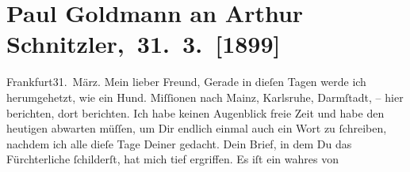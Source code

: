 

         
         \renewcommand{\erwaehntePersonen}{Personen: Leo Feld, Clementine Goldmann, Carl Karlweis, Fedor Mamroth, Marie Reinhard, Josef Rosengart, Vally Rosengart, Ferdinand von Saar}
         \renewcommand{\erwaehnteInstitutionen}{Institutionen: Bauernfeld-Preis}
         \renewcommand{\erwaehnteOrte}{Orte: Darmstadt, Frankfurt am Main, Karlsruhe, Mainz, Wien, Wiesbaden}
         \renewcommand{\erwaehnteWerke}{}
               \section[ Paul Goldmann an Arthur Schnitzler, 31. 3. {[}1899{]}]{ Paul Goldmann an Arthur Schnitzler, 31. 3. {[}1899{]}}\nopagebreak{}\rehead{ }\begin{ledgroupsized}[t]{13cm}\normalsize\beginnumbering \toendnotes[C]{\smallbreak\pagebreak[2]} 
\toendnotes[C]{\smallbreak}\pstart
           \raggedleft{}{\pb}Frankfurt31. März.\pend
           \pstart\center{}Mein lieber Freund,\pend\pstart
           Gerade in dieſen Tagen werde ich herumgehetzt, wie ein Hund. Miſſionen nach Mainz, Karlsruhe, Darmſtadt, – hier berichten,
               dort berichten. Ich habe keinen Augenblick freie Zeit und habe den heutigen \label{K_L02871-1v}\label{K_L02871-1h} abwarten müſſen, um Dir endlich einmal auch ein Wort zu ſchreiben, nachdem
               ich \strikeout{\textcolor{gray}{×}\-\textcolor{gray}{×}\-\textcolor{gray}{×}} alle dieſe Tage \strikeout{\textcolor{gray}{×}\-\textcolor{gray}{×}\-\textcolor{gray}{×}}{ }\label{K_L02871-2v}\label{K_L02871-2h} Deiner gedacht.\pend
           \pstart
           Dein Brief, in dem Du das Fürchterliche ſchilderſt, hat mich tief ergriffen. Es iſt
               ein wahres \label{K_L02871-3v}\label{K_L02871-3h} von

\end{ledgroupsized}

